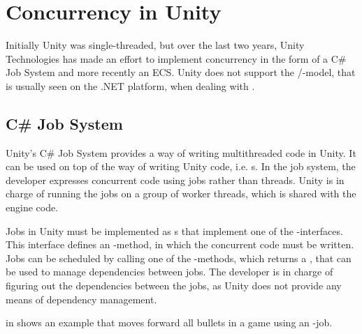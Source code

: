 \section{Concurrency in Unity} \label{sec:unity:concurrency}
Initially Unity was single-threaded, but over the last two years, Unity Technologies has made an effort to implement concurrency in the form of a C\# Job System\cite{unity:csharp:job:system} and more recently an \gls{ECS}\cite{unity:ecs}. Unity does not support the /-model, that is usually seen on the .NET platform, when dealing with \cite{unity:async,csharp:async}.

\subsection{C\# Job System}
Unity's C\# Job System provides a \textit{} way of writing multithreaded code in Unity. It can be used on top of the  way of writing Unity code, i.e. s. In the job system, the developer expresses concurrent code using jobs rather than threads. Unity is in charge of running the jobs on a group of worker threads, which is shared with the engine code\cite{unity:csharp:job:system}.

Jobs in Unity must be implemented as s that implement one of the -interfaces. This interface defines an -method, in which the concurrent code must be written. Jobs can be scheduled by calling one of the -methods, which returns a , that can be used to manage dependencies between jobs. The developer is in charge of figuring out the dependencies between the jobs, as Unity does not provide any means of dependency management\cite{unity:csharp:job:system}.

 in  shows an example that moves forward all bullets in a game using an -job.

